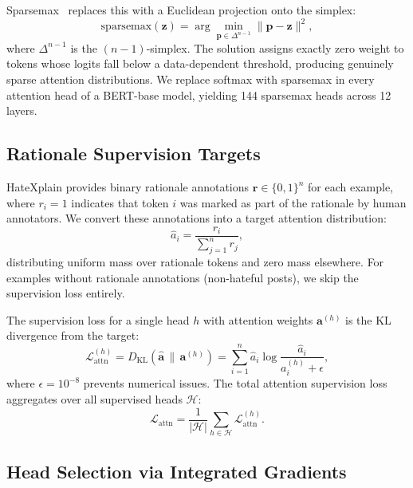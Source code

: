 \documentclass{article}
\begin{document}
Sparsemax~\citep{martins2016sparsemax} replaces this with a Euclidean
projection onto the simplex:
\begin{equation}
  \text{sparsemax}(\mathbf{z}) = \arg\min_{\mathbf{p} \in \Delta^{n-1}}
    \|\mathbf{p} - \mathbf{z}\|^2,
  \label{eq:sparsemax}
\end{equation}
where $\Delta^{n-1}$ is the $(n{-}1)$-simplex. The solution assigns exactly
zero weight to tokens whose logits fall below a data-dependent threshold,
producing genuinely sparse attention distributions. We replace softmax with
sparsemax in every attention head of a BERT-base model, yielding 144
sparsemax heads across 12 layers.

\subsection{Rationale Supervision Targets}
\label{sec:targets}

HateXplain provides binary rationale annotations $\mathbf{r} \in \{0,1\}^n$
for each example, where $r_i = 1$ indicates that token $i$ was marked as
part of the rationale by human annotators. We convert these annotations into
a target attention distribution:
\begin{equation}
  \hat{a}_i = \frac{r_i}{\sum_{j=1}^{n} r_j},
  \label{eq:target}
\end{equation}
distributing uniform mass over rationale tokens and zero mass elsewhere.
For examples without rationale annotations (non-hateful posts), we skip the
supervision loss entirely.

The supervision loss for a single head $h$ with attention weights
$\mathbf{a}^{(h)}$ is the KL divergence from the target:
\begin{equation}
  \mathcal{L}_{\text{attn}}^{(h)} = D_{\text{KL}}(\hat{\mathbf{a}} \,\|\, \mathbf{a}^{(h)})
    = \sum_{i=1}^{n} \hat{a}_i \log \frac{\hat{a}_i}{a_i^{(h)} + \epsilon},
  \label{eq:kl}
\end{equation}
where $\epsilon = 10^{-8}$ prevents numerical issues. The total attention
supervision loss aggregates over all supervised heads $\mathcal{H}$:
\begin{equation}
  \mathcal{L}_{\text{attn}} = \frac{1}{|\mathcal{H}|} \sum_{h \in \mathcal{H}}
    \mathcal{L}_{\text{attn}}^{(h)}.
  \label{eq:attn_loss}
\end{equation}

\subsection{Head Selection via Integrated Gradients}
\label{sec:head_selection}
\end{document}
